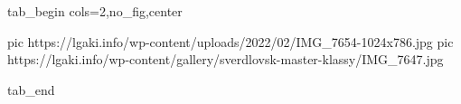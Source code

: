  
 
 
 
 


\ifcmt
  tab_begin cols=2,no_fig,center

     pic https://lgaki.info/wp-content/uploads/2022/02/IMG_7654-1024x786.jpg
     pic https://lgaki.info/wp-content/gallery/sverdlovsk-master-klassy/IMG_7647.jpg

  tab_end
\fi

